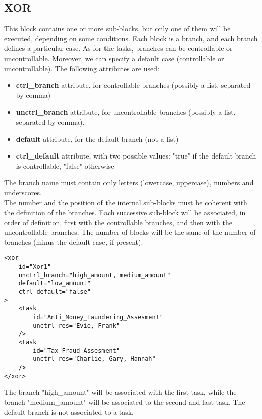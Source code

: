 \documentclass{article}
\begin{document}
\subsection{XOR}
This block contains one or more sub-blocks, but only one of them will be executed, depending on some conditions. Each block is a branch, and each branch defines a particular case. As for the tasks, branches can be controllable or uncontrollable. Moreover, we can specify a default case (controllable or uncontrollable). The following attributes are used:
\begin{itemize}
    \item \textbf{ctrl\_branch} attribute, for controllable branches (possibly a list, separated by comma)
    \item \textbf{unctrl\_branch} attribute, for uncontrollable branches (possibly a list, separated by comma).
    \item \textbf{default} attribute, for the default branch (not a list)
    \item \textbf{ctrl\_default} attribute, with two possible values: "true" if the default branch is controllable, "false" otherwise
\end{itemize}
The branch name must contain only letters (lowercase, uppercase), numbers and underscores.\\
The number and the position of the internal sub-blocks must be coherent with the definition of the branches. Each successive sub-block will be associated, in order of definition, first with the controllable branches, and then with the uncontrollable branches. The number of blocks will be the same of the number of branches (minus the default case, if present).
\begin{lstlisting}
<xor 
    id="Xor1"
    unctrl_branch="high_amount, medium_amount"
    default="low_amount"
    ctrl_default="false"
>
    <task 
        id="Anti_Money_Laundering_Assesment" 
        unctrl_res="Evie, Frank"
    />
    <task 
        id="Tax_Fraud_Assesment" 
        unctrl_res="Charlie, Gary, Hannah"
    />
</xor> 
\end{lstlisting}
The branch "high\_amount" will be associated with the first task, while the branch "medium\_amount" will be associated to the second and last task. The default branch is not associated to a task. 
\end{document}
